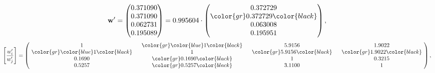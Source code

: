 \begin{example}
\begin{equation*}
\mathbf{w}^{\prime} =
\begin{pmatrix}
0.371090\\
0.371090\\
0.062731\\
0.195089
\end{pmatrix} =
0.995604\cdot
\begin{pmatrix}
0.372729\\
\color{gr} 0.372729\color{black} \\
0.063008\\
0.195951
\end{pmatrix},
\end{equation*}
\begin{equation*}
\left[ \frac{{w}^{\prime}_i}{{w}^{\prime}_j} \right] =
\begin{pmatrix}
$\,\,$ 1 $\,\,$ & $\,\,$\color{gr} \color{blue} 1\color{black} $\,\,$ & $\,\,$5.9156$\,\,$ & $\,\,$1.9022$\,\,$ \\
$\,\,$\color{gr} \color{blue} 1\color{black} $\,\,$ & $\,\,$ 1 $\,\,$ & $\,\,$\color{gr} 5.9156\color{black} $\,\,$ & $\,\,$\color{gr} 1.9022\color{black}   $\,\,$ \\
$\,\,$0.1690$\,\,$ & $\,\,$\color{gr} 0.1690\color{black} $\,\,$ & $\,\,$ 1 $\,\,$ & $\,\,$0.3215 $\,\,$ \\
$\,\,$0.5257$\,\,$ & $\,\,$\color{gr} 0.5257\color{black} $\,\,$ & $\,\,$3.1100$\,\,$ & $\,\,$ 1  $\,\,$ \\
\end{pmatrix},
\end{equation*}
\end{example}
\newpage
